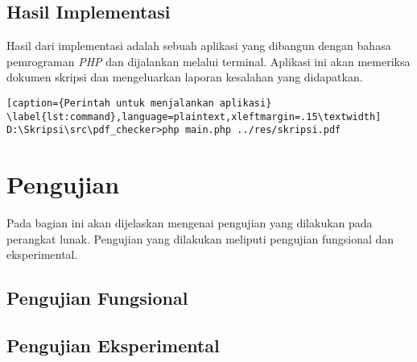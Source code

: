 \subsection{Hasil Implementasi}
Hasil dari implementasi adalah sebuah aplikasi yang dibangun dengan bahasa pemrograman \textit{PHP} dan dijalankan melalui terminal. Aplikasi ini akan memeriksa dokumen skripsi dan mengeluarkan laporan kesalahan yang didapatkan. 

\begin{lstlisting}[caption={Perintah untuk menjalankan aplikasi}			\label{lst:command},language=plaintext,xleftmargin=.15\textwidth] 
D:\Skripsi\src\pdf_checker>php main.php ../res/skripsi.pdf
\end{lstlisting}

\section{Pengujian}
Pada bagian ini akan dijelaskan mengenai pengujian yang dilakukan pada perangkat lunak. Pengujian yang dilakukan meliputi pengujian fungsional dan eksperimental.

\subsection{Pengujian Fungsional}

\subsection{Pengujian Eksperimental}
